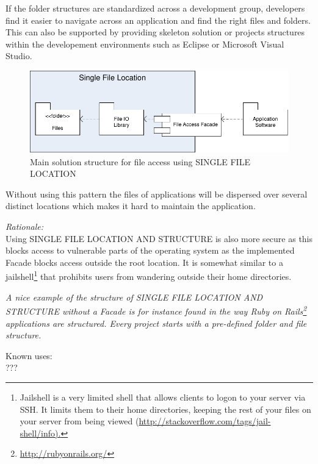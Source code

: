 If the folder structures are standardized
across a development group, developers find it easier to navigate across an application and find the right files and folders. This can also be supported by providing skeleton solution or projects structures within the developement environments such as Eclipse or Microsoft Visual Studio.

\begin{figure}[h!]
\centering
\includegraphics{patterns/singleFileLocationDiagram-02.pdf}
\caption{Main solution structure for file access using SINGLE FILE LOCATION}
\label{fig:singleFileLocationDiagram-02}
\end{figure}

Without using this pattern the files of applications will be dispersed over several distinct locations which makes it hard to maintain the application. 

\begin{center}
   
\end{center}

\textit{Rationale:}\\
Using SINGLE FILE LOCATION AND STRUCTURE is also more secure as this blocks access to vulnerable parts of the operating system as the implemented {\sc Facade} blocks access outside the root location. It is somewhat similar to a jailshell\footnote{Jailshell is a very limited shell that allows clients to logon to your server via SSH. It limits them to their home directories, keeping the rest of your files on your server from being viewed (\url{http://stackoverflow.com/tags/jail-shell/info).}} that prohibits users from wandering outside their home directories.

\textit{A nice example of the structure of SINGLE FILE LOCATION AND STRUCTURE 
without a {\sc Facade} is for instance found in the way Ruby on Rails\footnote{\url{http://rubyonrails.org/}} applications are structured. Every project starts with a pre-defined folder and file structure.}

 



Known uses:\\
???

